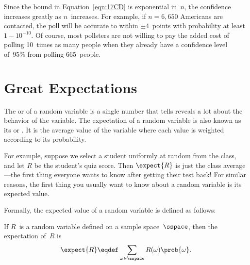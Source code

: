 \begin{editingnotes}
Since the bound in Equation~\ref{eqn:17CD} is exponential in~$n$, the
confidence increases greatly as $n$~increases.  For example, if $n =
6{,}650$ Americans are contacted, the poll will be accurate to within
$\pm 4$~points with probability at least~$1 - 10^{-10}$.  Of
course, most pollsters are not willing to pay the added cost of
polling 10~times as many people when they already have a confidence
level of~95\% from polling 665~people.

\end{editingnotes}

\begin{problems}
\practiceproblems
{}

\classproblems
{}

\homeworkproblems
{}
\end{problems}



\section{Great Expectations}\label{expectation_sec}

The  or  of a random variable
is a single number that tells reveals a lot about the behavior of the
variable.  The expectation of a random variable is also known as its
 or .  It is the average value of the
variable where each value is weighted according to its probability.

For example, suppose we select a student uniformly at random from the
class, and let $R$ be the student's quiz score.  Then  $\expect{R}$ is just the class average ---the first
thing everyone wants to know after getting their test back!  For similar
reasons, the first thing you usually want to know about a random variable
is its expected value.

Formally, the expected value of a random variable is defined as follows:
\begin{definition}\label{def:expectation}
If $R$~is a random variable defined on a sample space~$\sspace$, then
the expectation of~$R$ is
\begin{equation}\label{eqn:expectation}
    \expect{R} \eqdef \sum_{\omega \in \sspace} R(\omega) \prob{\omega}.
\end{equation}
\end{definition}

